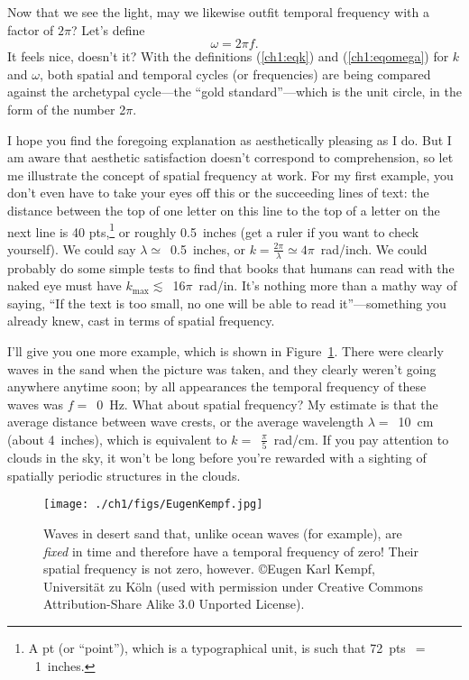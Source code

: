 Now that we see the light, may we likewise outfit temporal frequency with a
factor of $2 \pi$? Let's define
\begin{equation}
  \label{ch1:eqomega}
  \omega = 2 \pi f.
\end{equation}
It feels nice, doesn't it? With the definitions (\ref{ch1:eqk}) and
(\ref{ch1:eqomega}) for $k$ and $\omega$, both spatial and temporal cycles (or
frequencies) are being compared against the archetypal cycle---the ``gold
standard''---which is the unit circle, in the form of the number 2$\pi$.

I hope you find the foregoing explanation as aesthetically pleasing as I do. But
I am aware that aesthetic satisfaction doesn't correspond to comprehension, so
let me illustrate the concept of spatial frequency at work. For my first
example, you don't even have to take your eyes off this or the succeeding lines
of text: the distance between the top of one letter on this line to the top of a
letter on the next line is 40 pts,\footnote{A pt (or ``point''), which is a
  typographical unit, is such that 72~pts~$=$~1~inches.}  or roughly 0.5~inches
(get a ruler if you want to check yourself). We could say
$\lambda \simeq$~0.5~inches, or
$k = \frac{2 \pi}{\lambda} \simeq 4 \pi$~rad/inch. We could probably do some
simple tests to find that books that humans can read with the naked eye must
have $k_{\textrm{max}} \lesssim$~16$\pi$~rad/in. It's nothing more than a mathy
way of saying, ``If the text is too small, no one will be able to read
it''---something you already knew, cast in terms of spatial frequency.

I'll give you one more example, which is shown in
Figure~\ref{ch1:FigDesert}. There were clearly waves in the sand when the
picture was taken, and they clearly weren't going anywhere anytime soon; by all
appearances the temporal frequency of these waves was $f =$~0~Hz. What about
spatial frequency? My estimate is that the average distance between wave crests,
or the average wavelength $\lambda =$~10~cm (about 4~inches), which is
equivalent to $k =$~$\frac{\pi}{5}$~rad/cm. If you pay attention to clouds in
the sky, it won't be long before you're rewarded with a sighting of spatially
periodic structures in the clouds.


\begin{figure}
  \centering
  \noindent\texttt{[image: ./ch1/figs/EugenKempf.jpg]}
  \caption[Desert waves (\copyright E.K. Kempf, Universit\"{a}t zu
  K\"{o}ln)]{Waves in desert sand that, unlike ocean waves (for example), are
    \emph{fixed} in time and therefore have a temporal frequency of zero! Their
    spatial frequency is not zero, however. \copyright Eugen Karl Kempf,
    Universit\"{a}t zu K\"{o}ln (used with permission under Creative Commons
    Attribution-Share Alike 3.0 Unported License).}
  \label{ch1:FigDesert}
\end{figure}

